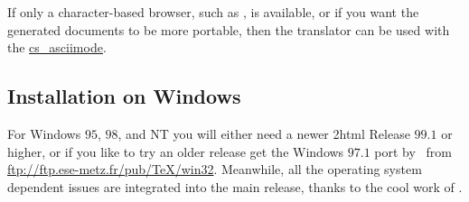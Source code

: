 If only a character-based browser, such as , is available, 
or if you want the generated documents to be more portable, 
then the translator can be used with the  
\hyperref{option}{option (see Section~}{)}{cs_asciimode}. 


\subsection{Installation on Windows}
\label{windowsinst}

%
For Windows $95$, $98$, and NT you will either need a newer
\latex2html{} Release $99.1$ or higher, or if you like to try an
older release get the Windows $97.1$ port by \Popineau\ from
\url{ftp://ftp.ese-metz.fr/pub/TeX/win32}.
Meanwhile, all the operating system dependent issues are integrated
into the main release, thanks to the cool work of \Rouchal.

